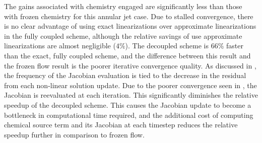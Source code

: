 The gains associated with chemistry engaged are significantly less than those
with frozen chemistry for this annular jet case.  Due to stalled convergence,
there is no clear advantage of using exact linearizations over approximate
linearizations in the fully coupled scheme, although the relative savings of use
approximate linearizations are almost negligible ($4\%$).  The decoupled scheme
is 66\% faster than the exact, fully coupled scheme, and the difference between
this result and the frozen flow result is the poorer iterative convergence
quality.  As discussed in , the frequency of
the Jacobian evaluation is tied to the decrease in the residual from each
non-linear solution update.  Due to the poorer convergence seen in
, the Jacobian is reevaluated at each iteration.
This significantly diminishes the relative speedup of the decoupled scheme.
This causes the Jacobian update to become a bottleneck in computational time
required, and the additional cost of computing chemical source term and its
Jacobian at each timestep reduces the relative speedup further in comparison to
frozen flow.

